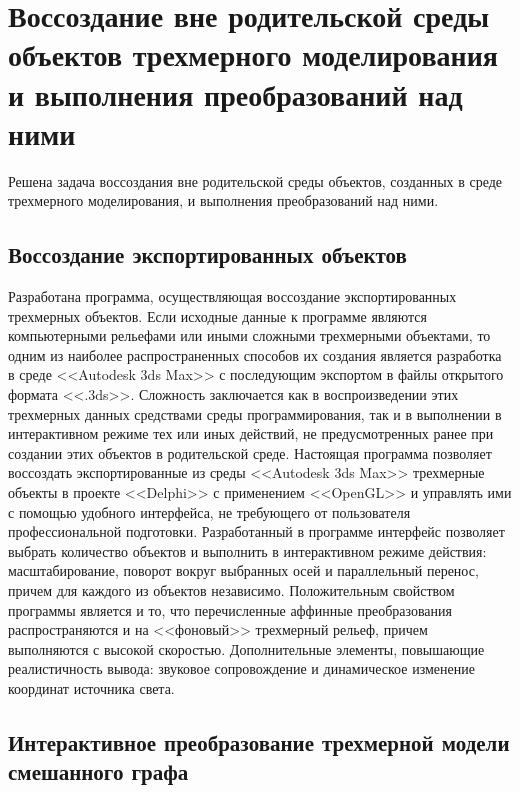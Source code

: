 \section{Воссоздание вне родительской среды объектов трехмерного моделирования и выполнения преобразований над ними}

Решена задача воссоздания вне родительской среды объектов, созданных в среде трехмерного моделирования, и выполнения преобразований над ними.

\subsection{Воссоздание экспортированных объектов}

Разработана программа, осуществляющая воссоздание экспортированных трехмерных объектов.
Если исходные данные к программе являются компьютерными рельефами или иными сложными трехмерными объектами, то одним из наиболее распространенных способов их создания является разработка в среде <<Autodesk 3ds Max>> с последующим экспортом в файлы открытого формата <<.3ds>>. Сложность заключается как в воспроизведении этих трехмерных данных средствами среды программирования, так и в выполнении в интерактивном режиме тех или иных действий, не предусмотренных ранее при создании этих объектов в родительской среде.
Настоящая программа позволяет воссоздать экспортированные из среды <<Autodesk 3ds Max>> трехмерные объекты в проекте <<Delphi>> с применением <<OpenGL>> и управлять ими с помощью удобного интерфейса, не требующего от пользователя профессиональной подготовки.
Разработанный в программе интерфейс позволяет выбрать количество объектов и выполнить в интерактивном режиме действия: масштабирование, поворот вокруг выбранных осей и параллельный перенос, причем для каждого из объектов независимо.
Положительным свойством программы является и то, что перечисленные аффинные преобразования распространяются и на <<фоновый>> трехмерный рельеф, причем выполняются с высокой скоростью.
Дополнительные элементы, повышающие реалистичность вывода: звуковое сопровождение и динамическое изменение координат источника света.



\subsection{Интерактивное преобразование трехмерной модели смешанного графа}

